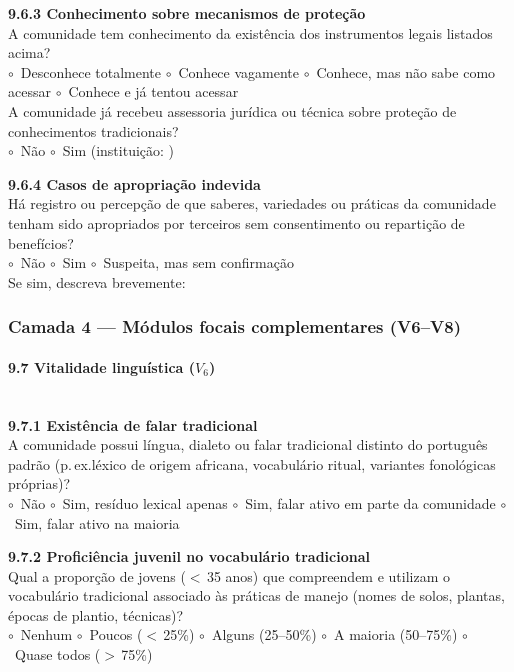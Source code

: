 \medskip\noindent\textbf{9.6.3 Conhecimento sobre mecanismos de proteção}\\[2pt]
A comunidade tem conhecimento da existência dos instrumentos legais listados acima?\\
$\circ$~Desconhece totalmente \quad $\circ$~Conhece vagamente \quad $\circ$~Conhece, mas não sabe como acessar \quad $\circ$~Conhece e já tentou acessar\\[4pt]
A comunidade já recebeu assessoria jurídica ou técnica sobre proteção de conhecimentos tradicionais?\\
$\circ$~Não \quad $\circ$~Sim (instituição: \dotfill)

\medskip\noindent\textbf{9.6.4 Casos de apropriação indevida}\\[2pt]
Há registro ou percepção de que saberes, variedades ou práticas da comunidade tenham sido apropriados por terceiros sem consentimento ou repartição de benefícios?\\
$\circ$~Não \quad $\circ$~Sim \quad $\circ$~Suspeita, mas sem confirmação\\[2pt]
Se sim, descreva brevemente: \dotfill\\[2pt]\dotfill

\subsubsection{Camada 4 --- Módulos focais complementares (V6--V8)}

\paragraph{9.7 Vitalidade linguística ($V_6$)}~\\[4pt]

\textbf{9.7.1 Existência de falar tradicional}\\[2pt]
A comunidade possui língua, dialeto ou falar tradicional distinto do português padrão (p.\,ex.\@ léxico de origem africana, vocabulário ritual, variantes fonológicas próprias)?\\
$\circ$~Não \quad $\circ$~Sim, resíduo lexical apenas \quad $\circ$~Sim, falar ativo em parte da comunidade \quad $\circ$~Sim, falar ativo na maioria

\medskip\noindent\textbf{9.7.2 Proficiência juvenil no vocabulário tradicional}\\[2pt]
Qual a proporção de jovens ($<$\,35 anos) que compreendem e utilizam o vocabulário tradicional associado às práticas de manejo (nomes de solos, plantas, épocas de plantio, técnicas)?\\
$\circ$~Nenhum \quad $\circ$~Poucos ($<$\,25\%) \quad $\circ$~Alguns (25--50\%) \quad $\circ$~A maioria (50--75\%) \quad $\circ$~Quase todos ($>$\,75\%)

